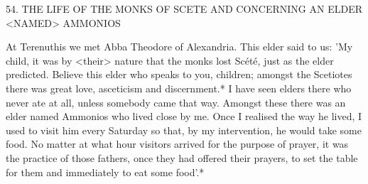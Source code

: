 54. THE LIFE OF THE MONKS OF SCETE
AND CONCERNING AN ELDER <NAMED> AMMONIOS

At Terenuthis we met Abba Theodore of Alexandria. This elder said
to us: 'My child, it was by <their> nature that the monks lost Scété,
just as the elder predicted. Believe this elder who speaks to you,
children; amongst the Scetiotes there was great love, asceticism and
discernment.* I have seen elders there who never ate at all, unless
somebody came that way. Amongst these there was an elder named
Ammonios who lived close by me. Once I realised the way he lived,
I used to visit him every Saturday so that, by my intervention, he
would take some food. No matter at what hour visitors arrived for
the purpose of prayer, it was the practice of those fathers, once they
had offered their prayers, to set the table for them and immediately
to eat some food'.*


